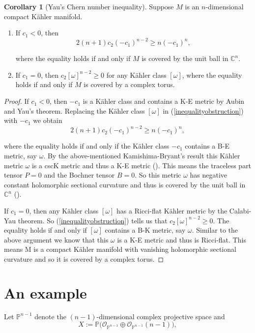\documentclass[11pt]{amsart}
\theoremstyle{definition}
\newtheorem{corollary}[theorem]{Corollary}
\theoremstyle{remark}
\numberwithin{equation}{section}
\begin{document}
\begin{corollary}[Yau's Chern number inequality]\label{yauchernnumber}
Suppose $M$ is an $n$-dimensional compact K\"{a}hler manifold.

\begin{enumerate}
\item
If $c_1<0$, then
$$2(n+1)c_2(-c_1)^{n-2}\geq n(-c_1)^n,$$

 where the
equality holds if and only if $M$ is covered by the unit ball in
$\mathbb{C}^n$.

\item
If $c_1=0$, then $c_2[\omega]^{n-2}\geq0$ for any K\"{a}hler class
$[\omega]$, where the equality holds if and only if $M$ is covered
by a complex torus.
\end{enumerate}
\end{corollary}

\begin{proof}
If $c_1<0$, then $-c_1$ is a K\"{a}hler class and contains a K-E
metric by Aubin and Yau's theorem. Replacing the K\"{a}hler class
$[\omega]$ in (\ref{inequalityobstruction}) with $-c_1$ we obtain
$$2(n+1)c_2(-c_1)^{n-2}\geq n(-c_1)^n,$$

where the equality holds if and only if the K\"{a}hler class $-c_1$
contains a B-E metric, say $\omega$. By the above-mentioned
Kamishima-Bryant's result this K\"{a}hler metric $\omega$ is a cscK
metric and thus a K-E metric (\cite[p. 19, Prop. 2.12]{Ti}). This
means the traceless part tensor $P=0$ and the Bochner tensor $B=0$.
So this metric $\omega$ has negative constant holomorphic sectional
curvature and thus is covered by the unit ball in $\mathbb{C}^n$
(\cite[Theorem 1.12]{Ti}).

If $c_1=0$, then any K\"{a}hler class $[\omega]$ has a Ricci-flat
K\"{a}hler metric by the Calabi-Yau theorem. So
(\ref{inequalityobstruction}) tells us that
$c_2[\omega]^{n-2}\geq0$. The equality holds if and only if
$[\omega]$ contains a B-K metric, say $\omega$. Similar to the above
argument we know that this $\omega$ is a K-E metric and thus is
Ricci-flat. This means M is a compact K\"{a}hler manifold with
vanishing holomorphic sectional curvature and so it is covered by a
complex torus.
\end{proof}

\section{An example}\label{section2}
Let $\mathbb{P}^{n-1}$ denote the $(n-1)$-dimensional complex
projective space and
$$X:=\mathbb{P}\big(\mathcal{O}_{\mathbb{P}^{n-1}}
\oplus\mathcal{O}_{\mathbb{P}^{n-1}}(n-1)\big),$$
\end{document}

